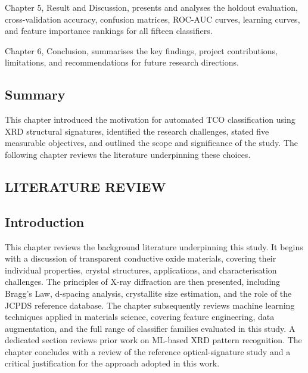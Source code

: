 \documentclass[12pt, oneside]{article} %
\begin{document}
Chapter 5, Result and Discussion, presents and analyses the holdout evaluation, cross-validation accuracy, confusion matrices, ROC-AUC curves, learning curves, and feature importance rankings for all fifteen classifiers.

Chapter 6, Conclusion, summarises the key findings, project contributions, limitations, and recommendations for future research directions.


\subsection{Summary}

This chapter introduced the motivation for automated TCO classification using XRD structural signatures, identified the research challenges, stated five measurable objectives, and outlined the scope and significance of the study. The following chapter reviews the literature underpinning these choices.


\vfill \null

\newpage



\vfill \null
\thispagestyle{empty}
\begin{center}
\section{LITERATURE REVIEW}
\end{center}
\vspace{2cm}


\subsection{Introduction}

This chapter reviews the background literature underpinning this study. It begins with a discussion of transparent conductive oxide materials, covering their individual properties, crystal structures, applications, and characterisation challenges. The principles of X-ray diffraction are then presented, including Bragg's Law, d-spacing analysis, crystallite size estimation, and the role of the JCPDS reference database. The chapter subsequently reviews machine learning techniques applied in materials science, covering feature engineering, data augmentation, and the full range of classifier families evaluated in this study. A dedicated section reviews prior work on ML-based XRD pattern recognition. The chapter concludes with a review of the reference optical-signature study and a critical justification for the approach adopted in this work.
\end{document}
